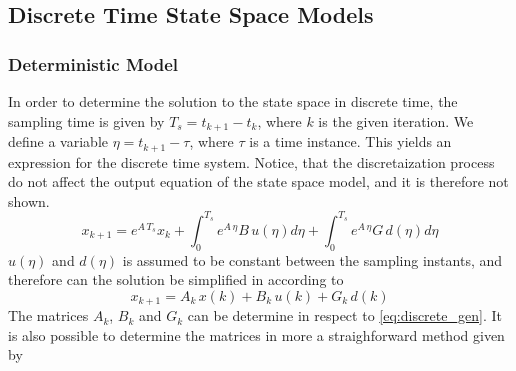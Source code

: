 \subsection{Discrete Time State Space Models}
\label{sec:Dis_LTI}
\subsubsection{Deterministic Model}
In order to determine the solution to the state space in discrete time, the sampling time is given by $T_s=t_{k+1}-t_k$, where $k$ is the given iteration. We define a variable $\eta=t_{k+1}-\tau$, where $\tau$ is a time instance. This yields an expression for the discrete time system. Notice, that the discretaization process do not affect the output equation of the state space model, and it is therefore not shown.
\begin{equation}
    x_{k+1}=e^{A\,T_s}x_k+\int_0^{T_s}e^{A\,\eta}B\,u(\eta)d\eta+\int_0^{T_s}e^{A\,\eta}G\,d(\eta)d\eta
    \label{eq:discrete_gen}
\end{equation}
$u(\eta)$ and $d(\eta)$ is assumed to be constant between the sampling instants, and therefore can the solution be simplified in according to
\begin{equation}
    x_{k+1}=A_k\,x(k)+B_k\,u(k)+G_k\,d(k)
\end{equation}
The matrices $A_k$, $B_k$ and $G_k$ can be determine in respect to \cref{eq:discrete_gen}. It is also possible to determine the matrices in more a straighforward method given by
